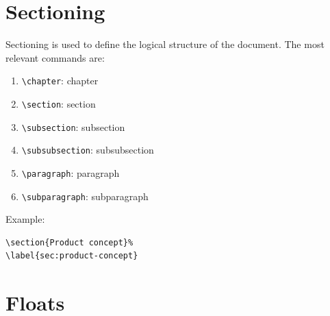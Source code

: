 \documentclass[11pt]{article}
\begin{document}
\section{Sectioning}
\label{sec:orgceb07cf}
Sectioning is used to define the logical structure of the document. The most
relevant commands are:
\begin{enumerate}
\item \texttt{\textbackslash{}chapter}: chapter
\item \texttt{\textbackslash{}section}: section
\item \texttt{\textbackslash{}subsection}: subsection
\item \texttt{\textbackslash{}subsubsection}: subsubsection
\item \texttt{\textbackslash{}paragraph}: paragraph
\item \texttt{\textbackslash{}subparagraph}: subparagraph
\end{enumerate}

Example:
\lstset{language=[LaTeX]TeX,label= ,caption= ,captionpos=b,numbers=none}
\begin{lstlisting}
\section{Product concept}%
\label{sec:product-concept}

\end{lstlisting}
\section{Floats}
\label{sec:org291797e}
\end{document}
